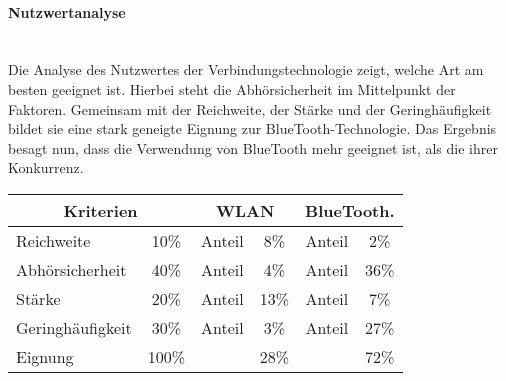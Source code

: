 \begin{indentE}
	\paragraph{Nutzwertanalyse}\mbox{}\\
	Die Analyse des Nutzwertes der Verbindungstechnologie zeigt, welche Art am besten geeignet ist. Hierbei steht die Abhörsicherheit im Mittelpunkt der Faktoren. Gemeinsam mit der Reichweite, der Stärke und der Geringhäufigkeit bildet sie eine stark geneigte Eignung zur BlueTooth-Technologie. Das Ergebnis besagt nun, dass die Verwendung von BlueTooth mehr geeignet ist, als die ihrer Konkurrenz.
	\begin{table}[H]
		\begin{center}
			\begin{tabularx} {\linewidth}{|X|c|c|c|c|c|}
				\hline
				\multicolumn{2}{|c|}{\textbf{Kriterien}} & 
				\multicolumn{2}{c|}{\textbf{WLAN}} &
				\multicolumn{2}{c|}{\textbf{BlueTooth.}} \\
				\hline
				Reichweite & 10\% & Anteil & 8\% & Anteil & 2\% \\
				\hline
				Abhörsicherheit & 40\% & Anteil & 4\% & Anteil & 36\% \\
				\hline
				Stärke & 20\% & Anteil & 13\% & Anteil & 7\%  \\
				\hline
				Geringhäufigkeit & 30\% & Anteil & 3\% & Anteil & 27\%  \\
				\hline
				Eignung & 100\% &  & 28\% &  & 72\%\\
				\cline{1-2}
				\cline{4-4}
				\cline{6-6}
			\end{tabularx}
		\end{center}
	\end{table}
\end{indentE}
